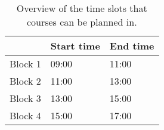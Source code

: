 \begin{table}
	\centering
	\caption{Overview of the time slots that courses can be planned in.}
	\label{tbl:timeslots}
	\begin{tabular}{l|l|l}
		& Start time & End time \\ \hline
		Block 1 & 09:00 & 11:00 \\
		Block 2 & 11:00 & 13:00 \\
		Block 3 & 13:00 & 15:00 \\
		Block 4 & 15:00 & 17:00
	\end{tabular}
\end{table}

